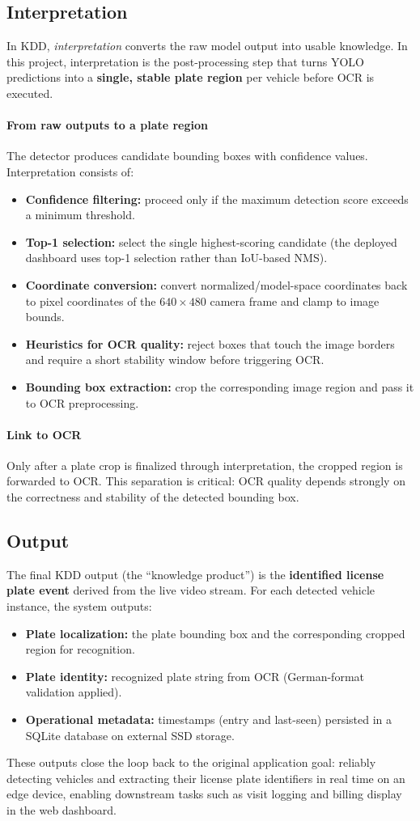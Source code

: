 \subsection{Interpretation}
\label{subsec:kdd_interpretation}

In KDD, \textit{interpretation} converts the raw model output into usable knowledge. In this project, interpretation is the post-processing step that turns YOLO predictions into a \textbf{single, stable plate region} per vehicle before OCR is executed.

\paragraph{From raw outputs to a plate region}
The detector produces candidate bounding boxes with confidence values. Interpretation consists of:
\begin{itemize}
	\item \textbf{Confidence filtering:} proceed only if the maximum detection score exceeds a minimum threshold.
	\item \textbf{Top-1 selection:} select the single highest-scoring candidate (the deployed dashboard uses top-1 selection rather than IoU-based NMS).
	\item \textbf{Coordinate conversion:} convert normalized/model-space coordinates back to pixel coordinates of the \(640\times480\) camera frame and clamp to image bounds.
	\item \textbf{Heuristics for OCR quality:} reject boxes that touch the image borders and require a short stability window before triggering OCR.
	\item \textbf{Bounding box extraction:} crop the corresponding image region and pass it to OCR preprocessing.
\end{itemize}

\paragraph{Link to OCR}
Only after a plate crop is finalized through interpretation, the cropped region is forwarded to OCR. This separation is critical: OCR quality depends strongly on the correctness and stability of the detected bounding box.

\subsection{Output}
\label{subsec:kdd_output}

The final KDD output (the ``knowledge product'') is the \textbf{identified license plate event} derived from the live video stream. For each detected vehicle instance, the system outputs:
\begin{itemize}
	\item \textbf{Plate localization:} the plate bounding box and the corresponding cropped region for recognition.
	\item \textbf{Plate identity:} recognized plate string from OCR (German-format validation applied).
	\item \textbf{Operational metadata:} timestamps (entry and last-seen) persisted in a SQLite database on external SSD storage.
\end{itemize}

These outputs close the loop back to the original application goal: reliably detecting vehicles and extracting their license plate identifiers in real time on an edge device, enabling downstream tasks such as visit logging and billing display in the web dashboard.
